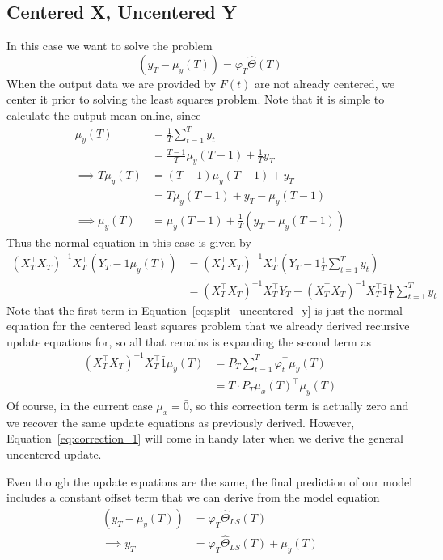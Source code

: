 \subsection{Centered X, Uncentered Y}
In this case we want to solve the problem
\begin{equation}
  (y_T - \mu_y(T)) = \varphi_T\hat\Theta(T)
\end{equation}
When the output data we are provided by $F(t)$ are not already centered, we
center it prior to solving the least squares problem. Note that it is simple to calculate the output mean online, since
\begin{align}
  \mu_y(T) &= \frac{1}{T}\sum_{t=1}^T y_t \\
           &= \frac{T - 1}{T}\mu_y(T - 1) + \frac{1}{T}y_T \\
  \implies T\mu_y(T) &= (T - 1)\mu_y(T - 1) + y_T \\
                     &= T \mu_y(T - 1) + y_T - \mu_y(T - 1) \\
  \implies \mu_y(T) &= \mu_y(T - 1) + \frac{1}{T} (y_T - \mu_y(T-1))
\end{align}
Thus the normal equation in this case is given by 
\begin{align}
  (X_T^\top X_T)^{-1} X_T^\top \left(Y_T - \bar{1}\mu_y(T)\right) &= (X_T^\top X_T)^{-1} X_T^\top \left(Y_T - \bar{1}\frac{1}{T}\sum_{t=1}^Ty_t\right) \\
                                                                  &= (X_T^\top X_T)^{-1} X_T^\top Y_T - (X_T^\top X_T)^{-1} X_T^\top \bar{1}\frac{1}{T}\sum_{t=1}^Ty_t \label{eq:split_uncentered_y}
\end{align}
Note that the first term in Equation~\ref{eq:split_uncentered_y} is just the
normal equation for the centered least squares problem that we already derived
recursive update equations for, so all that remains is expanding the second
term as
\begin{align}
  (X_T^\top X_T)^{-1} X_T^\top \bar{1}\mu_y(T) &= P_T \sum_{t=1}^T \varphi_t^\top \mu_y(T) \\
                                               &= T \cdot P_T \mu_x(T)^\top \mu_y(T) \label{eq:correction_1}
\end{align}
Of course, in the current case $\mu_x = \bar{0}$, so this correction term is
actually zero and we recover the same update equations as previously derived.
However, Equation~\ref{eq:correction_1} will come in handy later when we derive
the general uncentered update.

Even though the update equations are the same, the final prediction of our
model includes a constant offset term that we can derive from the model
equation
\begin{align}
  (y_T - \mu_y(T)) &= \varphi_T\hat\Theta_{LS}(T) \\
  \implies y_T &= \varphi_T\hat\Theta_{LS}(T) + \mu_y(T)
\end{align}

